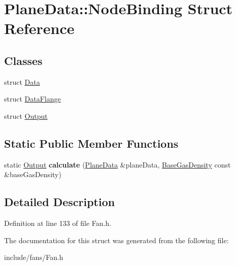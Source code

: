 \hypertarget{struct_plane_data_1_1_node_binding}{}\section{Plane\+Data\+:\+:Node\+Binding Struct Reference}
\label{struct_plane_data_1_1_node_binding}
\subsection*{Classes}
\begin{DoxyCompactItemize}
\item 
struct \hyperlink{struct_plane_data_1_1_node_binding_1_1_data}{Data}
\item 
struct \hyperlink{struct_plane_data_1_1_node_binding_1_1_data_flange}{Data\+Flange}
\item 
struct \hyperlink{struct_plane_data_1_1_node_binding_1_1_output}{Output}
\end{DoxyCompactItemize}
\subsection*{Static Public Member Functions}
\begin{DoxyCompactItemize}
\item 
\mbox{\label{struct_plane_data_1_1_node_binding_a50084489fc0b1ad5048226c2f04e1d49}} 
static \hyperlink{struct_plane_data_1_1_node_binding_1_1_output}{Output} {\bfseries calculate} (\hyperlink{class_plane_data}{Plane\+Data} \&plane\+Data, \hyperlink{class_base_gas_density}{Base\+Gas\+Density} const \&base\+Gas\+Density)
\end{DoxyCompactItemize}


\subsection{Detailed Description}


Definition at line 133 of file Fan.\+h.



The documentation for this struct was generated from the following file\+:\begin{DoxyCompactItemize}
\item 
include/fans/Fan.\+h\end{DoxyCompactItemize}
